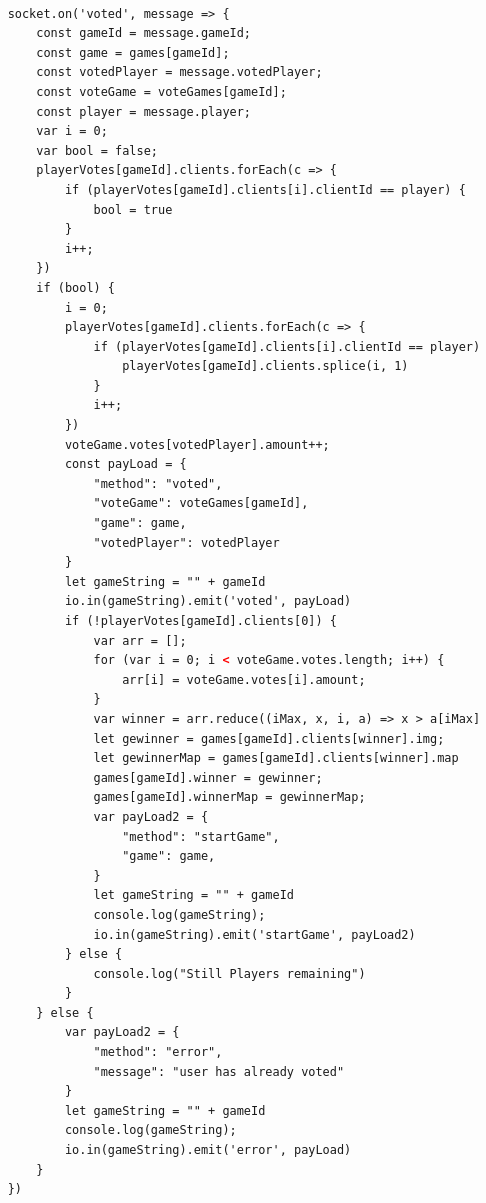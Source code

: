 \begin{lstlisting}[language=html,caption= User voted Server]
    
    socket.on('voted', message => {
        const gameId = message.gameId;
        const game = games[gameId];
        const votedPlayer = message.votedPlayer;
        const voteGame = voteGames[gameId];
        const player = message.player;
        var i = 0;
        var bool = false;
        playerVotes[gameId].clients.forEach(c => {
            if (playerVotes[gameId].clients[i].clientId == player) {
                bool = true
            }
            i++;
        })
        if (bool) {
            i = 0;
            playerVotes[gameId].clients.forEach(c => {
                if (playerVotes[gameId].clients[i].clientId == player) {
                    playerVotes[gameId].clients.splice(i, 1)
                }
                i++;
            })
            voteGame.votes[votedPlayer].amount++;
            const payLoad = {
                "method": "voted",
                "voteGame": voteGames[gameId],
                "game": game,
                "votedPlayer": votedPlayer
            }
            let gameString = "" + gameId
            io.in(gameString).emit('voted', payLoad)
            if (!playerVotes[gameId].clients[0]) {
                var arr = [];
                for (var i = 0; i < voteGame.votes.length; i++) {
                    arr[i] = voteGame.votes[i].amount;
                }
                var winner = arr.reduce((iMax, x, i, a) => x > a[iMax] ? i : iMax, 0);
                let gewinner = games[gameId].clients[winner].img;
                let gewinnerMap = games[gameId].clients[winner].map
                games[gameId].winner = gewinner;
                games[gameId].winnerMap = gewinnerMap;
                var payLoad2 = {
                    "method": "startGame",
                    "game": game,
                }
                let gameString = "" + gameId
                console.log(gameString);
                io.in(gameString).emit('startGame', payLoad2)
            } else {
                console.log("Still Players remaining")
            }
        } else {
            var payLoad2 = {
                "method": "error",
                "message": "user has already voted"
            }
            let gameString = "" + gameId
            console.log(gameString);
            io.in(gameString).emit('error', payLoad)
        }
    })
    
\end{lstlisting}

